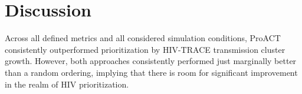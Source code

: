 \documentclass[twocolumn]{bmcart}%
\begin{document}

\section*{Discussion}
Across all defined metrics and all considered simulation conditions, ProACT consistently outperformed prioritization by HIV-TRACE transmission cluster growth. However, both approaches consistently performed just marginally better than a random ordering, implying that there is room for significant improvement in the realm of HIV prioritization.

\end{document}
